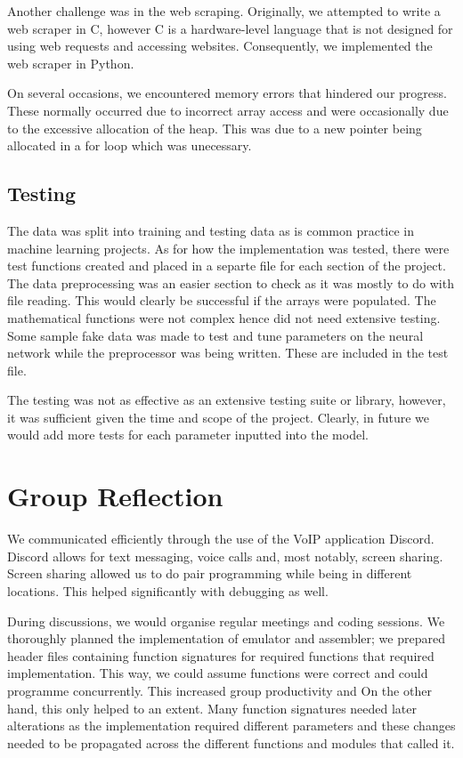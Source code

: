 \documentclass[11pt]{article}
\begin{document}
Another challenge was in the web scraping. Originally, we attempted to write a web scraper in C, however C is a hardware-level language that is not designed for using web requests and accessing websites. Consequently, we implemented the web scraper in Python.


On several occasions, we encountered memory errors that hindered our progress. These normally occurred due to incorrect array access and were occasionally due to the excessive allocation of the heap. This was due to a new pointer being allocated in a for loop which was unecessary. 

\subsection{Testing}
The data was split into training and testing data as is common practice in machine learning projects. As for how the implementation was tested, there were test functions created and placed in a separte file for each section of the project. The data preprocessing was an easier section to check as it was mostly to do with file reading. This would clearly be successful if the arrays were populated. The mathematical functions were not complex hence did not need extensive testing. Some sample fake data was made to test and tune parameters on the neural network while the preprocessor was being written. These are included in the test file. 

The testing was not as effective as an extensive testing suite or library, however, it was sufficient given the time and scope of the project. Clearly, in future we would add more tests for each parameter inputted into the model.

\section{Group Reflection}
We communicated efficiently through the use of the VoIP application Discord. 
Discord allows for text messaging, voice calls and, most notably, screen sharing.
Screen sharing allowed us to do pair programming while being in different locations. This helped significantly with debugging as well. 

During discussions, we would organise regular meetings and coding sessions. We thoroughly planned the implementation of emulator and assembler; we prepared header files containing function signatures
for required functions that 
 required implementation. This way, we could assume functions were correct and could programme concurrently.
This increased group productivity and 
On the other hand, this only helped to an extent. Many function signatures needed later alterations 
as the implementation required different parameters and these changes needed to be propagated 
across the different functions and modules that called it.
\end{document}
